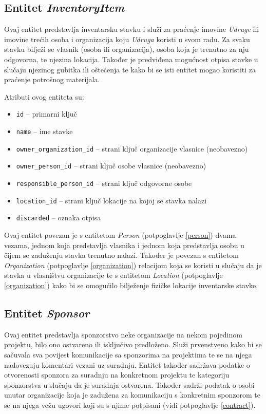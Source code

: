\documentclass[times, utf8, diplomski]{fer}
\begin{document}
\subsection{Entitet \emph{InventoryItem}} \label{inventory_item}

Ovaj entitet predstavlja inventarsku stavku i služi za praćenje imovine
\emph{Udruge} ili imovine trećih osoba i organizacija koju \emph{Udruga} koristi
u svom radu. Za svaku stavku bilježi se vlasnik (osoba ili organizacija), osoba
koja je trenutno za nju odgovorna, te njezina lokacija. Također je predviđena
mogućnost otpisa stavke u slučaju njezinog gubitka ili oštećenja te kako bi se
isti entitet mogao koristiti za praćenje potrošnog materijala.

\medskip
Atributi ovog entiteta su:
\begin{itemize}
    \item \texttt{id} -- primarni ključ
    \item \texttt{name} -- ime stavke
    \item \texttt{owner\_organization\_id} -- strani ključ organizacije
        vlasnice (neobavezno)
    \item \texttt{owner\_person\_id} -- strani ključ osobe vlasnice (neobavezno)
    \item \texttt{responsible\_person\_id} -- strani ključ odgovorne osobe
    \item \texttt{location\_id} -- strani ključ lokacije na kojoj se stavka
        nalazi
    \item \texttt{discarded} -- oznaka otpisa
\end{itemize}

Ovaj entitet povezan je s entitetom \emph{Person} (potpoglavlje \ref{person})
dvama vezama, jednom koja predstavlja vlasnika i jednom koja predstavlja osobu u
čijem se zaduženju stavka trenutno nalazi. Također je povezan s entitetom
\emph{Organization} (potpoglavlje \ref{organization}) relacijom koja se koristi
u slučaju da je stavka u vlasništvu organizacije te s entitetom \emph{Location}
(potpoglavlje \ref{organization}) kako bi se omogućilo bilježenje fizičke
lokacije inventarske stavke.

\subsection{Entitet \emph{Sponsor}} \label{sponsor}

Ovaj entitet predstavlja sponzorstvo neke organizacije na nekom pojedinom
projektu, bilo ono ostvareno ili isključivo predloženo. Služi prvenstveno kako
bi se sačuvala sva povijest komunikacije sa sponzorima na projektima te se na
njega nadovezuju komentari vezani uz suradnju. Entitet također sadržava podatke
o otvorenosti sponzora za suradnju na konkretnom projektu te kategoriju
sponzorstva u slučaju da je suradnja ostvarena. Također sadrži podatak o osobi
unutar organizacije koja je zadužena za komunikaciju s konkretnim sponzorom te
se na njega vežu ugovori koji su s njime potpisani (vidi potpoglavlje
\ref{contract}).
\end{document}
